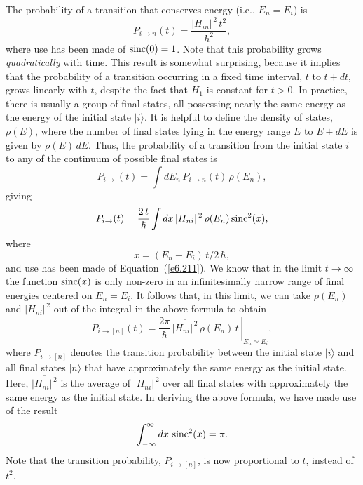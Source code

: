 The probability of a transition that conserves energy ({\rm i.e.}, $E_n = E_i$)
is
\begin{equation}
P_{i\rightarrow n} (t) = \frac{|H_{in}|^{\,2}\,t^2}{\hbar^2},
\end{equation}
where use has been made of ${\rm sinc}(0) = 1$. Note that this probability
grows {\em quadratically}\/ with time. This result is somewhat surprising, because 
it implies that the probability of a transition occurring in a fixed
time interval, $t$ to $t+dt$, grows linearly with $t$, despite the fact that
$H_1$ is constant for $t>0$. In practice, there is usually a group of
final states, all possessing  nearly the same energy as the energy of the
initial state $|i\rangle$. It is helpful to define the density of
states, $\rho(E)$, where the number of final states lying in the
energy range $E$ to $E+dE$ is given by $\rho(E)\,dE$. Thus, the
probability of a transition from the initial state $i$ to any of
the continuum of possible final states is
\begin{equation}
P_{i\rightarrow} (t) = \int dE_n\,P_{i\rightarrow n}(t) \,\rho(E_n),
\end{equation}
giving
\begin{equation}
P_{i\rightarrow} (t) = \frac{2\, t}{\hbar} \int dx\, |H_{ni}|^{\,2}\, \rho(E_n) \,{\rm sinc}^2(x),
\end{equation}
where 
\begin{equation}
x=(E_n-E_i)\,t/2\,\hbar,
\end{equation}
 and use has been made of Equation~(\ref{e6.211}). We know that in the limit $t\rightarrow
\infty$ the function ${\rm sinc}(x)$ is only non-zero in an infinitesimally
narrow range of final energies  centered on $E_n = E_i$. It follows that, in this limit,
we can take
$\rho(E_n)$ and $|H_{ni}|^{\,2}$ out of the integral in the above 
formula to obtain
\begin{equation}
P_{i\rightarrow[n]} (t) = \left.\frac{2\pi}{\hbar}\, \overline{|H_{ni}|^{\,2}}
 \,\rho(E_n)\,t\,
\right|_{E_n\simeq E_i},
\end{equation}
where $P_{i\rightarrow [n]}$ denotes the transition probability between 
the initial state $|i\rangle$
and all final states $|n\rangle$ that have approximately the same energy
as the initial state.
Here, $\overline{|H_{ni}|^{\,2}}$ is the average of $|H_{ni}|^{\,2}$ over
all final states with approximately the same energy as the initial state.
In deriving the above formula, we have made use of the result
\begin{equation}
\int_{-\infty}^{\infty} dx\,\,{\rm sinc}^2(x) = \pi.
\end{equation}
Note that the transition probability, $P_{i\rightarrow [n]}$,
 is now proportional to $t$, instead
of $t^2$. 

